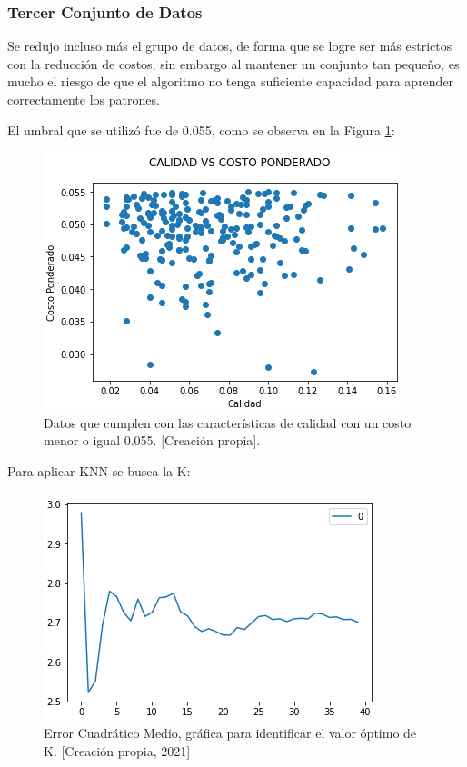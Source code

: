 \documentclass{article}
\begin{document}
\subsubsection{Tercer Conjunto de Datos}

Se redujo incluso más el grupo de datos, de forma que se logre ser más estrictos con la reducción de costos, sin embargo al mantener un conjunto tan pequeño, es mucho el riesgo de que el algoritmo no tenga suficiente capacidad para aprender correctamente los patrones. 

El umbral que se utilizó fue de 0.055, como se observa en la Figura \ref{fig:costo_calidad_acotada3}:

\begin{figure}[!h]
    \centering
    \includegraphics[scale=.7]{F4/F4-im22.PNG}
    \caption{Datos que cumplen con las características de calidad con un costo menor o igual 0.055. [Creación propia].}
    \label{fig:costo_calidad_acotada3}
\end{figure}
\pagebreak

Para aplicar KNN se busca la K:

\begin{figure}[!h]
    \centering
    \includegraphics[scale=.7]{F4/F4-im23.PNG}
    \caption{Error Cuadrático Medio, gráfica para identificar el valor óptimo de K. [Creación propia, 2021]}
    \label{fig:Codo3}
\end{figure}
\end{document}
